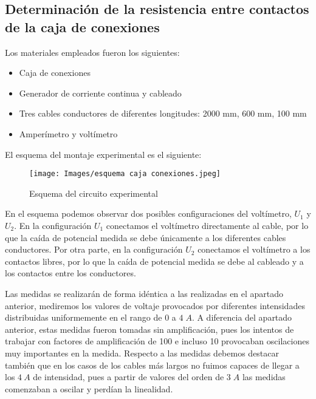 \documentclass[a4paper,12pt,titlepage]{article}
\begin{document}
\newpage

\subsection{Determinación de la resistencia entre contactos de la caja de conexiones}

Los materiales empleados fueron los siguientes:

\begin{itemize}
    \item Caja de conexiones
    \item Generador de corriente continua y cableado
    \item Tres cables conductores de diferentes longitudes: 2000 mm, 600 mm, 100 mm
    \item Amperímetro y voltímetro
\end{itemize}

El esquema del montaje experimental es el siguiente:

\begin{figure}[h!]
    \centering
    \texttt{[image: Images/esquema caja conexiones.jpeg]}
    \caption{Esquema del circuito experimental}
    \label{Caja de conexiones}
\end{figure}

En el esquema podemos observar dos posibles configuraciones del voltímetro, $U_{1}$ y $U_{2}$. En la configuración $U_{1}$ conectamos el voltímetro directamente al cable, por lo que la caída de potencial medida se debe únicamente a los diferentes cables conductores. Por otra parte, en la configuración $U_{2}$ conectamos el voltímetro a los contactos libres, por lo que la caída de potencial medida se debe al cableado y a los contactos entre los conductores.

\par Las medidas se realizarán de forma idéntica a las realizadas en el apartado anterior, mediremos los valores de voltaje provocados por diferentes intensidades distribuidas uniformemente en el rango de $0$ a $4 \;A$. A diferencia del apartado anterior, estas medidas fueron tomadas sin amplificación, pues los intentos de trabajar con factores de amplificación de 100 e incluso 10 provocaban oscilaciones muy importantes en la medida. Respecto a las medidas debemos destacar también que en los casos de los cables más largos no fuimos capaces de llegar a los $4 \: A$ de intensidad, pues a partir de valores del orden de $3\; A$ las medidas comenzaban a oscilar y perdían la linealidad.
\end{document}
